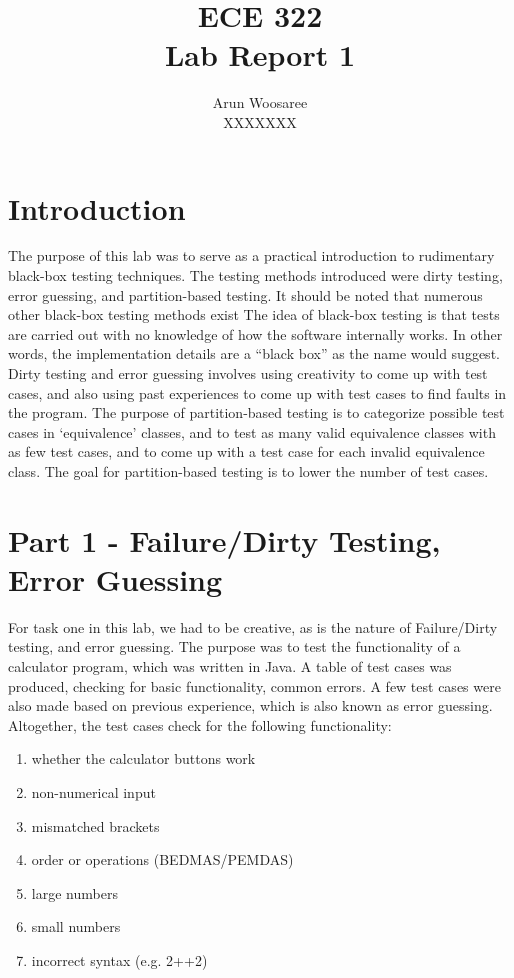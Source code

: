 \documentclass[letterpaper]{article}
\title{ECE 322 \\
Lab Report 1}
\author{Arun Woosaree\\
XXXXXXX}
\begin{document}
\maketitle

\section*{Introduction}
The purpose of this lab was to serve as a practical introduction to rudimentary black-box testing techniques.
The testing methods introduced were dirty testing, error guessing, and partition-based testing.
It should be noted that numerous other black-box testing methods exist
The idea of black-box testing is that tests are carried out with no knowledge of how the software
internally works. In other words, the implementation details are a ``black box'' as the name would suggest.
Dirty testing and error guessing involves using creativity to come up with test cases,
and also using past experiences to come up with test cases to find faults in the program.
The purpose of partition-based testing is to categorize possible test cases in `equivalence'
classes, and to test as many valid equivalence classes with as few test cases, and to come up
with a test case for each invalid equivalence class. The goal for partition-based testing
is to lower the number of test cases.

\section*{Part 1 - Failure/Dirty Testing, Error Guessing}
For task one in this lab, we had to be creative, as is the nature of Failure/Dirty testing, and error guessing.
The purpose was to test the functionality of a calculator program, which was written in Java. A table of
test cases was produced, checking for basic functionality, common errors. A few test cases were also
made based on previous experience, which is also known as error guessing. Altogether, the test cases check
for the following functionality:

\begin{enumerate}
    \item whether the calculator buttons work
    \item non-numerical input
    \item mismatched brackets
    \item order or operations (BEDMAS/PEMDAS)
    \item large numbers
    \item small numbers
    \item incorrect syntax (e.g. 2++2)
\end{enumerate}
\end{document}
